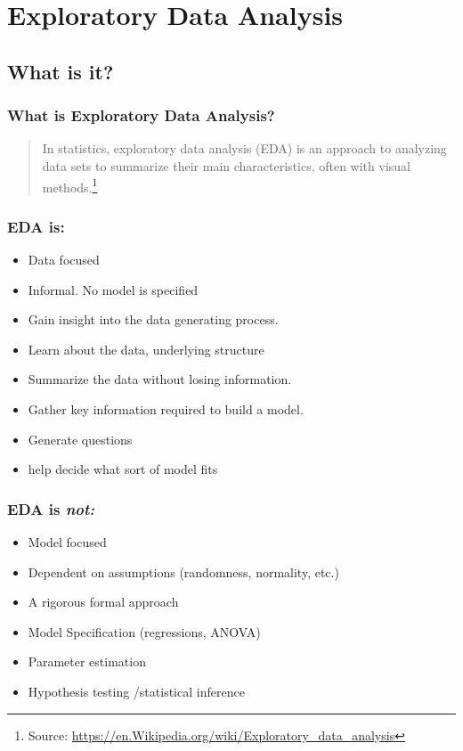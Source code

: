 \documentclass{beamer}
\begin{document}
\section{Exploratory Data Analysis}


\subsection{What is it?} 

\begin{frame}
\frametitle{What is Exploratory Data Analysis?} 

\begin{quote}
In statistics, exploratory data analysis (EDA) is an approach to analyzing data sets to summarize their main characteristics, often with visual methods.\footnote{Source: \url{https://en.Wikipedia.org/wiki/Exploratory_data_analysis}}
\end{quote}

\end{frame}



\begin{frame}
\frametitle{EDA is:}

\begin{itemize}
\item Data focused
\item Informal. No model is specified
\item Gain insight into the data generating process. 
\item Learn about the data, underlying structure
\item Summarize the data without losing information. 
\item Gather key information required to build a model. 
\item Generate questions 
\item help decide what sort of model fits
\end{itemize}

\end{frame}



\begin{frame}
\frametitle{EDA is \em{not}:}

\begin{itemize}
\item Model focused
\item Dependent on assumptions (randomness, normality, etc.)
\item A rigorous formal approach
\item Model Specification (regressions, ANOVA)
\item Parameter estimation
\item Hypothesis testing \slash statistical inference
\end{itemize}

\end{frame}
\end{document}
